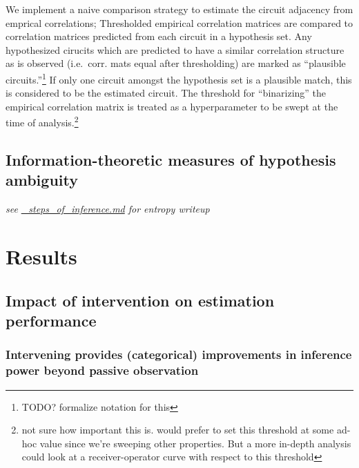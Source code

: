 We implement a naive comparison strategy to estimate the circuit
adjacency from emprical correlations; Thresholded empirical correlation
matrices are compared to correlation matrices predicted from each
circuit in a hypothesis set. Any hypothesized cirucits which are
predicted to have a similar correlation structure as is observed
(i.e.~corr. mats equal after thresholding) are marked as ``plausible
circuits.''\footnote{TODO? formalize notation for this} If only one
circuit amongst the hypothesis set is a plausible match, this is
considered to be the estimated circuit. The threshold for ``binarizing''
the empirical correlation matrix is treated as a hyperparameter to be
swept at the time of analysis.\footnote{not sure how important this is.
  would prefer to set this threshold at some ad-hoc value since we're
  sweeping other properties. But a more in-depth analysis could look at
  a receiver-operator curve with respect to this threshold}

\hypertarget{information-theoretic-measures-of-hypothesis-ambiguity}{%
\subsection{Information-theoretic measures of hypothesis
ambiguity}\label{information-theoretic-measures-of-hypothesis-ambiguity}}

\emph{see \url{_steps_of_inference.md} for entropy writeup}

\hypertarget{results}{%
\section{Results}\label{results}}

\hypertarget{impact-of-intervention-on-estimation-performance}{%
\subsection{Impact of intervention on estimation
performance}\label{impact-of-intervention-on-estimation-performance}}

\hypertarget{intervening-provides-categorical-improvements-in-inference-power-beyond-passive-observation}{%
\subsubsection{Intervening provides (categorical) improvements in
inference power beyond passive
observation}\label{intervening-provides-categorical-improvements-in-inference-power-beyond-passive-observation}}

